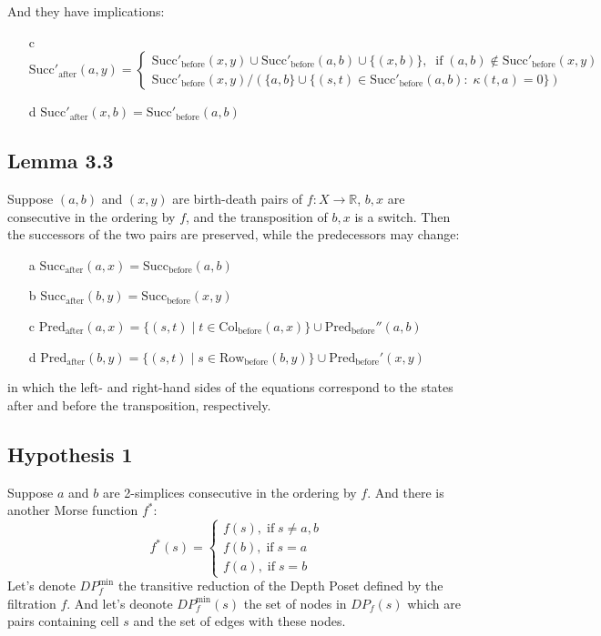 \documentclass{article}
\begin{document}
And they have implications:

\begin{itemize}
\item[c] $
\text{Succ}'_\text{after}(a, y) =
\begin{cases}
\text{Succ}'_\text{before}(x, y) \cup \text{Succ}'_\text{before}(a, b) \cup \{(x, b)\}, \;\; \text{if}\; (a, b)\notin \text{Succ}'_\text{before}(x, y) \\
\text{Succ}'_\text{before}(x, y) / (\{a, b\} \cup \{(s, t)\in \text{Succ}'_\text{before}(a, b):\; \kappa(t, a) = 0\})
\end{cases}
$
\item[d] $\text{Succ}'_\text{after}(x, b) = \text{Succ}'_\text{before}(a, b)$
\end{itemize}



\subsection{Lemma 3.3}
\par Suppose $(a,b)$ and $(x,y)$ are birth-death pairs of $f: X \to \mathbb{R}$, $b,x$ are consecutive in the ordering by $f$,
and the transposition of $b,x$ is a switch. Then the successors of the two pairs are preserved, while the predecessors may change:
\begin{itemize}
\item[a] $\text{Succ}_\text{after}(a, x) = \text{Succ}_\text{before}(a, b)$
\item[b] $\text{Succ}_\text{after}(b, y) = \text{Succ}_\text{before}(x, y)$
\item[c] $\text{Pred}_\text{after}(a, x) = \{(s,t) \mid t \in \text{Col}_\text{before}(a,x) \} \cup \text{Pred}_\text{before}''(a,b)$
\item[d] $\text{Pred}_\text{after}(b, y) = \{(s,t) \mid s \in \text{Row}_\text{before}(b,y) \} \cup \text{Pred}_\text{before}'(x,y)$
\end{itemize}
in which the left- and right-hand sides of the equations correspond to the states after and before the transposition, respectively.


\subsection{Hypothesis 1}
\par Suppose $a$ and $b$ are 2-simplices consecutive in the ordering by $f$. And there is another Morse function $f^*$:
$$
f^*(s) =
\begin{cases}
f(s), \; \text{if} \; s\ne a, b \\
f(b), \; \text{if} \; s = a \\
f(a), \; \text{if} \; s = b
\end{cases}
$$
Let's denote $DP_{f}^\text{min}$ the transitive reduction of the Depth Poset defined by the filtration $f$. And let's deonote $DP_{f}^\text{min}(s)$ the set of nodes in $DP_f(s)$ which are pairs containing cell $s$ and the set of edges with these nodes.
\end{document}

